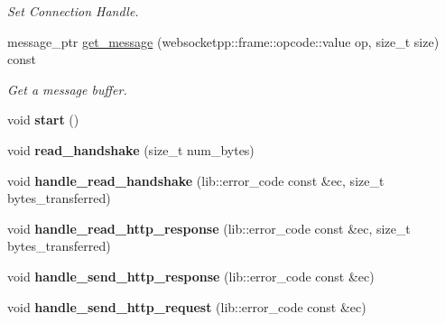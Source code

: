 \begin{DoxyCompactItemize}
\begin{DoxyCompactList}\small\item\em Set Connection Handle. \end{DoxyCompactList}\item 
message\+\_\+ptr \hyperlink{classwebsocketpp_1_1connection_a854cb45d1c96d0a2e19ad0ba827a0f9e}{get\+\_\+message} (websocketpp\+::frame\+::opcode\+::value op, size\+\_\+t size) const
\begin{DoxyCompactList}\small\item\em Get a message buffer. \end{DoxyCompactList}\item 
void {\bfseries start} ()\hypertarget{classwebsocketpp_1_1connection_a152530ff43396025175f85748d8ee708}{}\label{classwebsocketpp_1_1connection_a152530ff43396025175f85748d8ee708}

\item 
void {\bfseries read\+\_\+handshake} (size\+\_\+t num\+\_\+bytes)\hypertarget{classwebsocketpp_1_1connection_a9e19e781b4abda3e4a39f4f25077a29c}{}\label{classwebsocketpp_1_1connection_a9e19e781b4abda3e4a39f4f25077a29c}

\item 
void {\bfseries handle\+\_\+read\+\_\+handshake} (lib\+::error\+\_\+code const \&ec, size\+\_\+t bytes\+\_\+transferred)\hypertarget{classwebsocketpp_1_1connection_a9c7e83aae3418cdf71e6fcf1dce3a255}{}\label{classwebsocketpp_1_1connection_a9c7e83aae3418cdf71e6fcf1dce3a255}

\item 
void {\bfseries handle\+\_\+read\+\_\+http\+\_\+response} (lib\+::error\+\_\+code const \&ec, size\+\_\+t bytes\+\_\+transferred)\hypertarget{classwebsocketpp_1_1connection_a261ca392f8b31cd0f5a1b2ccc11c3037}{}\label{classwebsocketpp_1_1connection_a261ca392f8b31cd0f5a1b2ccc11c3037}

\item 
void {\bfseries handle\+\_\+send\+\_\+http\+\_\+response} (lib\+::error\+\_\+code const \&ec)\hypertarget{classwebsocketpp_1_1connection_a9098c4b3228b3d44ac065122a776bf7e}{}\label{classwebsocketpp_1_1connection_a9098c4b3228b3d44ac065122a776bf7e}

\item 
void {\bfseries handle\+\_\+send\+\_\+http\+\_\+request} (lib\+::error\+\_\+code const \&ec)\hypertarget{classwebsocketpp_1_1connection_af37addaf4d89de32d3d8f4da668313c5}{}\label{classwebsocketpp_1_1connection_af37addaf4d89de32d3d8f4da668313c5}


\end{DoxyCompactItemize}
